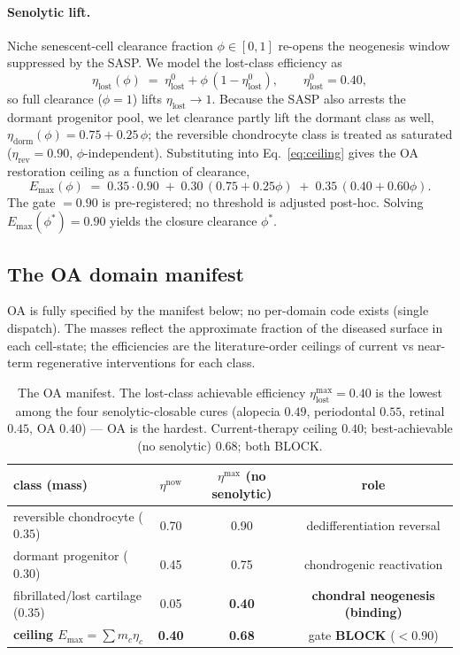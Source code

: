 \documentclass[11pt,a4paper]{article}
\begin{document}
\paragraph{Senolytic lift.} Niche senescent-cell clearance fraction $\phi\in[0,1]$
re-opens the neogenesis window suppressed by the SASP. We model the lost-class
efficiency as
\begin{equation}
\eta_{\text{lost}}(\phi) \;=\; \eta_{\text{lost}}^0 + \phi\,(1-\eta_{\text{lost}}^0),
\qquad \eta_{\text{lost}}^0 = 0.40 ,
\label{eq:lift}
\end{equation}
so full clearance ($\phi=1$) lifts $\eta_{\text{lost}}\!\to\!1$. Because the SASP also
arrests the dormant progenitor pool, we let clearance partly lift the dormant class as
well, $\eta_{\text{dorm}}(\phi)=0.75+0.25\,\phi$; the reversible chondrocyte class is
treated as saturated ($\eta_{\text{rev}}=0.90$, $\phi$-independent). Substituting into
Eq.~\eqref{eq:ceiling} gives the OA restoration ceiling as a function of clearance,
\begin{equation}
E_{\max}(\phi) \;=\; 0.35\cdot 0.90 \;+\; 0.30\,(0.75+0.25\phi) \;+\; 0.35\,(0.40+0.60\phi).
\label{eq:oaceiling}
\end{equation}
The gate $=0.90$ is pre-registered; no threshold is adjusted post-hoc. Solving
$E_{\max}(\phi^\ast)=0.90$ yields the closure clearance $\phi^\ast$.

\subsection{The OA domain manifest}
\label{sec:manifest}
OA is fully specified by the manifest below; no per-domain code exists (single dispatch).
The masses reflect the approximate fraction of the diseased surface in each cell-state;
the efficiencies are the literature-order ceilings of current vs near-term regenerative
interventions for each class.

\begin{table}[h]\centering\small
\begin{tabular}{lccc}
\toprule
\textbf{class (mass)} & $\eta^{\text{now}}$ & $\eta^{\max}$ (no senolytic) & role \\
\midrule
reversible chondrocyte ($0.35$) & 0.70 & 0.90 & dedifferentiation reversal \\
dormant progenitor ($0.30$) & 0.45 & 0.75 & chondrogenic reactivation \\
fibrillated/lost cartilage ($0.35$) & 0.05 & \textbf{0.40} & \textbf{chondral neogenesis (binding)} \\
\midrule
\textbf{ceiling $E_{\max}=\sum m_c\eta_c$} & \textbf{0.40} & \textbf{0.68} & gate \textbf{BLOCK} ($<0.90$) \\
\bottomrule
\end{tabular}
\caption{The OA manifest. The lost-class achievable efficiency
$\eta_{\text{lost}}^{\max}=0.40$ is the lowest among the four senolytic-closable cures
(alopecia $0.49$, periodontal $0.55$, retinal $0.45$, OA $0.40$) --- OA is the hardest.
Current-therapy ceiling $0.40$; best-achievable (no senolytic) $0.68$; both BLOCK.}
\label{tab:manifest}
\end{table}
\end{document}
